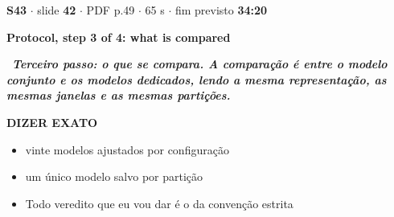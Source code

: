 \documentclass[11pt,a4paper]{article}
\begin{document}
\begin{tcolorbox}[breakable,colback=white,colframe=teal!55,boxrule=0.6pt,arc=2pt,left=3mm,right=3mm,top=2mm,bottom=2mm]
{\small\color{soft}\textbf{S43} $\cdot$ slide \textbf{42} $\cdot$ PDF p.49 $\cdot$ 65 s $\cdot$ fim previsto \textbf{34:20}}\par\vspace{1mm}
{\large\bfseries\color{ink} Protocol, step 3 of 4: what is compared}\par\vspace{2mm}
{\color{teal}\textbf{\textrightarrow}}\ \textbf{\itshape Terceiro passo: o que se compara. A comparação é entre o modelo conjunto e os modelos dedicados, lendo a mesma representação, as mesmas janelas e as mesmas partições.}\par\vspace{1.5mm}
{\small\color{teal}\textbf{DIZER EXATO}}
\begin{itemize}[leftmargin=6mm,itemsep=0.4mm,topsep=0.8mm]
\item vinte modelos ajustados por configuração
\item um único modelo salvo por partição
\item Todo veredito que eu vou dar é o da convenção estrita
\end{itemize}
\par
{}\par

\end{tcolorbox}
\end{document}

